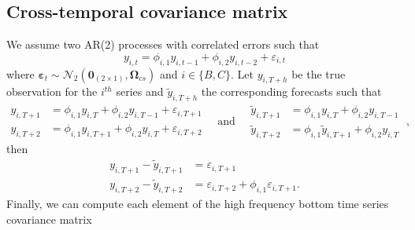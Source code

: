 \documentclass[a4paper,11pt]{article}
\newcommand{\epsvet}{\bm{\varepsilon}}
\newcommand{\Zerovet}{\bm{0}}
\newcommand{\Omegavet}{\bm{\Omega}}
\theoremstyle{definition}
\begin{document}
\newpage
\subsection{Cross-temporal covariance matrix}\label{app:ar2}

We assume two AR(2) processes with correlated errors such that
$$
	y_{i,t} = \phi_{i,1}y_{i,t-1} + \phi_{i,2}y_{i,t-2} + \varepsilon_{i,t}
$$
where $\epsvet_t \sim \mathcal{N}_{2}\left(\Zerovet_{(2\times 1)}, \Omegavet_{cs}\right)$ and $i \in \{B, C\}$. Let $y_{i,T+h}$ be the true observation for the $i^{th}$ series and $\widetilde{y}_{i,T+h}$ the corresponding forecasts such that
$$
	\begin{array}{rl}
		y_{i,T+1} & = \phi_{i,1}y_{i,T} + \phi_{i,2}y_{i,T-1} + \varepsilon_{i,T+1} \\
		y_{i,T+2} & = \phi_{i,1}y_{i,T+1} + \phi_{i,2}y_{i,T} + \varepsilon_{i,T+2}
	\end{array}
	\quad\text{and}\quad
	\begin{array}{rl}
		\widetilde{y}_{i,T+1} & = \phi_{i,1}y_{i,T} + \phi_{i,2}y_{i,T-1}             \\
		\widetilde{y}_{i,T+2} & = \phi_{i,1}\widetilde{y}_{i,T+1} + \phi_{i,2}y_{i,T}
	\end{array}\;,
$$
then
\begin{align*}
	y_{i,T+1} - \widetilde{y}_{i,T+1} & = \varepsilon_{i,T+1}                                   \\
	y_{i,T+2} - \widetilde{y}_{i,T+2} & = \varepsilon_{i,T+2} + \phi_{i,1} \varepsilon_{i,T+1}.
\end{align*}
Finally, we can compute each element of the high frequency bottom time series covariance matrix
\end{document}
